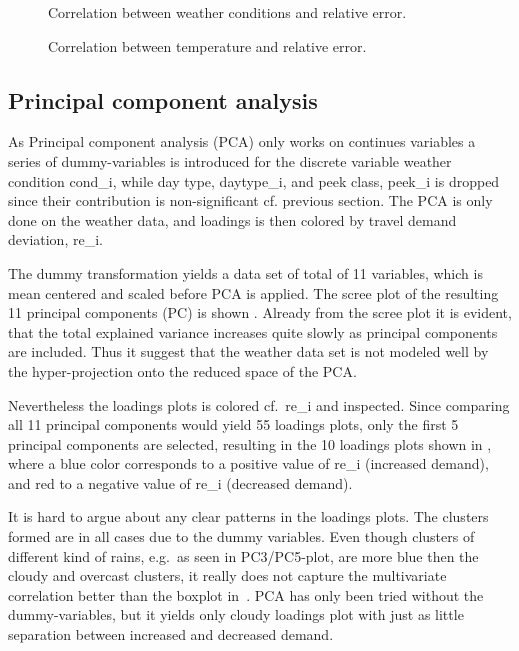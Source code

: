 \begin{figure}[!ht]
    \center
    
    \caption{Correlation between weather conditions and relative error.}
    \label{fig:cor_cond}
\end{figure}

\begin{figure}[!ht]
    \center
    
    \caption{Correlation between temperature and relative error.}
    \label{fig:cor_temp}
\end{figure}

\subsection{Principal component analysis}
As Principal component analysis (PCA) only works on continues variables a series of dummy-variables is introduced for the discrete variable weather condition \gls{cond_i}, while day type, \gls{daytype_i}, and peek class, \gls{peek_i} is dropped since their contribution is non-significant cf. previous section. The PCA is only done on the weather data, and loadings is then colored by travel demand deviation, \gls{re_i}.

The dummy transformation yields a data set of total of 11 variables, which is mean centered and scaled before PCA is applied. The scree plot of the resulting 11 principal components (PC) is shown . Already from the scree plot it is evident, that the total explained variance increases quite slowly as principal components are included. Thus it suggest that the weather data set is not modeled well by the hyper-projection onto the reduced space of the PCA.

Nevertheless the loadings plots is colored cf.\ \gls{re_i} and inspected. Since comparing all 11 principal components would yield 55 loadings plots, only the first 5 principal components are selected, resulting in the 10 loadings plots shown in , where a blue color corresponds to a positive value of \gls{re_i} (increased demand), and red to a negative value of \gls{re_i} (decreased demand).

It is hard to argue about any clear patterns in the loadings plots. The clusters formed are in all cases due to the dummy variables. Even though clusters of different kind of rains, e.g.\ as seen in PC3/PC5-plot, are more blue then the cloudy and overcast clusters, it really does not capture the multivariate correlation better than the boxplot in~. PCA has only been tried without the dummy-variables, but it yields only cloudy loadings plot with just as little separation between increased and decreased demand.

